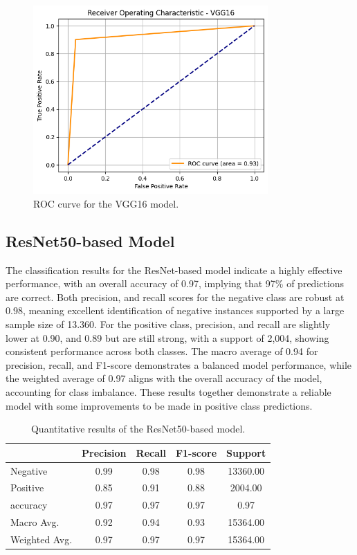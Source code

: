 \documentclass[../main]{subfiles}
\begin{document}
\begin{figure}[h]
	\centering
	\includegraphics[width=0.8\textwidth]{assets/roc_vgg16.png}
	\caption{ROC curve for the VGG16 model.}
    \label{fig:roc-vgg16}
\end{figure}

\subsection{ResNet50-based Model}
The classification results for the ResNet-based model indicate a highly effective performance, with an overall accuracy of 0.97, implying that 97\% of predictions are correct. Both precision, and recall scores for the negative class are robust at 0.98, meaning excellent identification of negative instances supported by a large sample size of 13.360. For the positive class, precision, and recall are slightly lower at 0.90, and 0.89 but are still strong, with a support of 2,004, showing consistent performance across both classes. The macro average of 0.94 for precision, recall, and F1-score demonstrates a balanced model performance, while the weighted average of 0.97 aligns with the overall accuracy of the model, accounting for class imbalance. These results together demonstrate a reliable model with some improvements to be made in positive class predictions.

\begin{table}[h]
    \centering
    \begin{tabular}{|l|c|c|c|c|}
        \hline
         & Precision & Recall & F1-score & Support \\ \hline
        Negative & 0.99 & 0.98 & 0.98 & 13360.00 \\ \hline
        Positive & 0.85 & 0.91 & 0.88 & 2004.00 \\ \hline
        accuracy & 0.97 & 0.97 & 0.97 & 0.97 \\ \hline
        Macro Avg. & 0.92 & 0.94 & 0.93 & 15364.00 \\ \hline
        Weighted Avg. & 0.97 & 0.97 & 0.97 & 15364.00 \\ \hline
    \end{tabular}
    \caption{Quantitative results of the ResNet50-based model.}
    \label{tab:quantitative-results-resnet}
\end{table}
\end{document}
